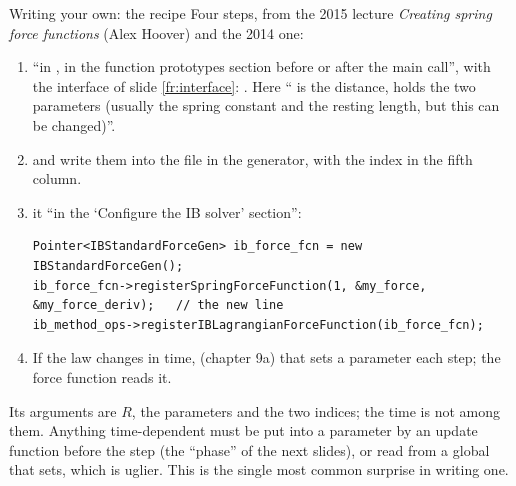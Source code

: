 \documentclass[aspectratio=169,11pt]{beamer}
\begin{document}
\begin{frame}[fragile]{Writing your own: the recipe}
\label{fr:recipe}
\footnotesize Four steps, from the 2015 lecture \emph{Creating spring force functions} (Alex Hoover) and the 2014 one:
\begin{enumerate}
  \item {} ``in , in the function prototypes section before or after the main call'', with the interface of slide \ref{fr:interface}: . Here `` is the distance,  holds the two parameters (usually the spring constant and the resting length, but this can be changed)''.
  \item {} and write them into the  file in the generator, with the index in the fifth column.
  \item {} it ``in the `Configure the IB solver' section'':
\begin{lstlisting}[style=cpptiny]
Pointer<IBStandardForceGen> ib_force_fcn = new IBStandardForceGen();
ib_force_fcn->registerSpringForceFunction(1, &my_force, &my_force_deriv);   // the new line
ib_method_ops->registerIBLagrangianForceFunction(ib_force_fcn);
\end{lstlisting}
  \item If the law changes in time,  (chapter 9a) that sets a parameter each step; the force function reads it.
\end{enumerate}
\begin{punchbox}
\footnotesize {} Its arguments are $R$, the parameters and the two indices; the time is not among them. Anything time-dependent must be put into a parameter by an update function before the step (the ``phase'' of the next slides), or read from a global that  sets, which is uglier. This is the single most common surprise in writing one.
\end{punchbox}
\end{frame}
\end{document}

